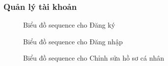 \subsubsection{Quản lý tài khoản}
\begin{figure}[H]
	\centering
	
	\vspace{0.5cm}
	\caption{Biểu đồ sequence cho Đăng ký}
	\label{fig:enter-label}
\end{figure}
\begin{figure}[H]
	\centering
	
	\vspace{0.5cm}
	\caption{Biểu đồ sequence cho Đăng nhập}
	\label{fig:enter-label}
\end{figure}
\begin{figure}[H]
	\centering
	
	\vspace{0.5cm}
	\caption{Biểu đồ sequence cho Chỉnh sửa hồ sơ cá nhân}
	\label{fig:enter-label}
\end{figure}

